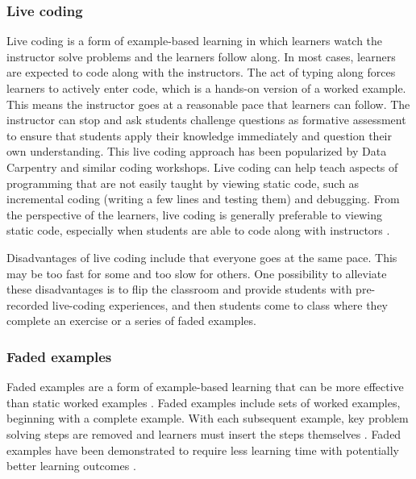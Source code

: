 \subsubsection{Live coding}\label{Livecoding}
Live coding is a form of example-based learning in which learners watch the instructor solve problems and the learners follow along. 
In most cases, learners are expected to code along with the instructors. 
The act of typing along forces learners to actively enter code, which is a hands-on version of a worked example.
This means the instructor goes at a reasonable pace that learners can follow.
The instructor can stop and ask students challenge questions as formative assessment to ensure that students apply their knowledge immediately and question their own understanding. 
This live coding approach has been popularized by Data Carpentry and similar coding workshops.
Live coding can help teach aspects of programming that are not easily taught by viewing static code, such as incremental coding (writing a few lines and testing them) and debugging. 
From the perspective of the learners, live coding is generally preferable to viewing static code, especially when students are able to code along with instructors \cite{raj_role_2018}.


Disadvantages of live coding include that everyone goes at the same pace.
This may be too fast for some and too slow for others.
One possibility to alleviate these disadvantages is to flip the classroom and provide students with pre-recorded live-coding experiences, and then students come to class where they complete an exercise or a series of faded examples. 


\subsubsection{Faded examples}\label{Fillable} 
Faded examples are a form of example-based learning that can be more effective than static worked examples \cite{schwonke_worked-example_2009}.
Faded examples include sets of worked examples, beginning with a complete example. 
With each subsequent example, key problem solving steps are removed and learners must insert the steps themselves \cite{renkl_toward_2014}. 
Faded examples have been demonstrated to require less learning time with potentially better learning outcomes \cite{schwonke_worked-example_2009}. 

